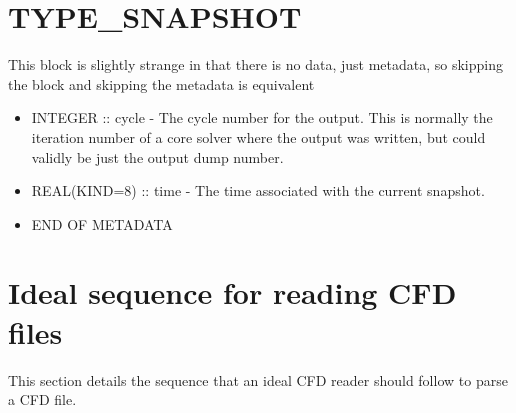 \documentclass[8pt]{article}
\begin{document}
\section{TYPE\_SNAPSHOT}
This block is slightly strange in that there is no data, just metadata, so skipping the block and skipping the metadata is equivalent
\begin{itemize}
\item INTEGER :: cycle - The cycle number for the output. This is normally the iteration number of a core solver where the output was written, but could validly be just the output dump number.
\item REAL(KIND=8) :: time - The time associated with the current snapshot.
\item END OF METADATA
\end{itemize}
\section{Ideal sequence for reading CFD files}
This section details the sequence that an ideal CFD reader should follow to parse a CFD file.
\end{document}
